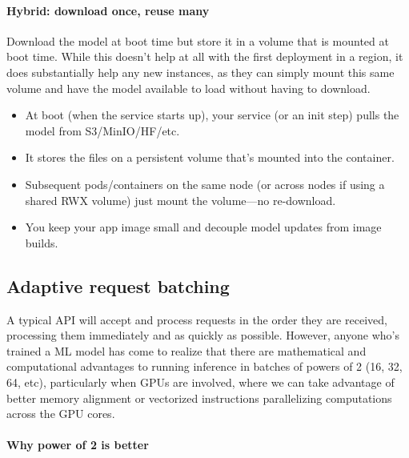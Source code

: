 \paragraph{Hybrid: download once, reuse many}

Download the model at boot time but store it in a volume that is mounted at boot time. While this doesn't help at all with the first deployment in a region, it does substantially help any new instances, as they can simply mount this same volume and have the model available to load without having to download. 

\begin{itemize}
	\item At boot (when the service starts up), your service (or an init step) pulls the model from S3/MinIO/HF/etc.
	\item It stores the files on a persistent volume that's mounted into the container.
	\item Subsequent pods/containers on the same node (or across nodes if using a shared RWX volume) just mount the volume—no re-download.
	\item You keep your app image small and decouple model updates from image builds.
\end{itemize}


\subsection{Adaptive request batching}
A typical API will accept and process requests in the order they are received, processing them immediately and as quickly as possible. However, anyone who's trained a ML model has come to realize that there are mathematical and computational advantages to running inference in batches of powers of 2 (16, 32, 64, etc), particularly when GPUs are involved, where we can take advantage of better memory alignment or vectorized instructions parallelizing computations across the GPU cores.  

\paragraph{Why power of 2 is better}

